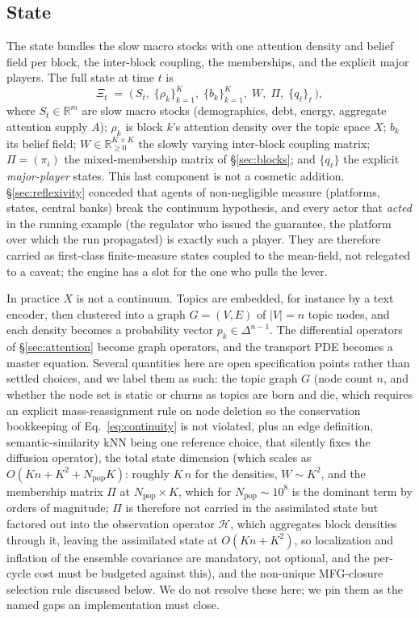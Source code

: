 \documentclass[11pt]{article}
\begin{document}
\subsection{State}

The state bundles the slow macro stocks with one attention density and belief field per block, the inter-block coupling, the memberships, and the explicit major players. The full state at time $t$ is
\begin{equation}
\Xi_t \;=\; \big(\, S_t,\; \{\rho_k\}_{k=1}^K,\; \{b_k\}_{k=1}^K,\; W,\; \Pi,\; \{q_\ell\}_{\ell} \,\big),
\end{equation}
where $S_t \in \mathbb{R}^m$ are slow macro stocks (demographics, debt, energy, aggregate attention supply $A$); $\rho_k$ is block $k$'s attention density over the topic space $X$; $b_k$ its belief field; $W \in \mathbb{R}^{K\times K}_{\geq 0}$ the slowly varying inter-block coupling matrix; $\Pi = (\pi_i)$ the mixed-membership matrix of \S\ref{sec:blocks}; and $\{q_\ell\}$ the explicit \emph{major-player} states. This last component is not a cosmetic addition. \S\ref{sec:reflexivity} conceded that agents of non-negligible measure (platforms, states, central banks) break the continuum hypothesis, and every actor that \emph{acted} in the running example (the regulator who issued the guarantee, the platform over which the run propagated) is exactly such a player. They are therefore carried as first-class finite-measure states coupled to the mean-field, not relegated to a caveat; the engine has a slot for the one who pulls the lever.

In practice $X$ is not a continuum. Topics are embedded, for instance by a text encoder, then clustered into a graph $G=(V,E)$ of $|V|=n$ topic nodes, and each density becomes a probability vector $p_k \in \Delta^{n-1}$. The differential operators of \S\ref{sec:attention} become graph operators, and the transport PDE becomes a master equation. Several quantities here are open specification points rather than settled choices, and we label them as such: the topic graph $G$ (node count $n$, and whether the node set is static or churns as topics are born and die, which requires an explicit mass-reassignment rule on node deletion so the conservation bookkeeping of Eq.~\eqref{eq:continuity} is not violated, plus an edge definition, semantic-similarity kNN being one reference choice, that silently fixes the diffusion operator), the total state dimension (which scales as $O(Kn + K^2 + N_{\mathrm{pop}}K)$: roughly $K\,n$ for the densities, $W\sim K^2$, and the membership matrix $\Pi$ at $N_{\mathrm{pop}}\times K$, which for $N_{\mathrm{pop}}\sim10^8$ is the dominant term by orders of magnitude; $\Pi$ is therefore not carried in the assimilated state but factored out into the observation operator $\mathcal{H}$, which aggregates block densities through it, leaving the assimilated state at $O(Kn+K^2)$, so localization and inflation of the ensemble covariance are mandatory, not optional, and the per-cycle cost must be budgeted against this), and the non-unique MFG-closure selection rule discussed below. We do not resolve these here; we pin them as the named gaps an implementation must close.
\end{document}

